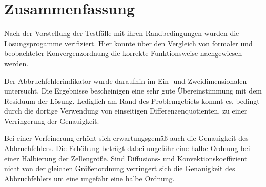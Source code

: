 \section{Zusammenfassung}
Nach der Vorstellung der Testfälle mit ihren Randbedingungen wurden
die Lösungsprogamme verifiziert. Hier konnte über den Vergleich von formaler
und beobachteter Konvergenzordnung die korrekte Funktionsweise nachgewiesen werden.

Der Abbruchfehlerindikator wurde daraufhin im Ein- und Zweidimensionalen untersucht.
Die Ergebnisse bescheinigen eine sehr gute Übereinstimmung mit dem Residuum
der Lösung. Lediglich am Rand des Problemgebiets kommt es, bedingt durch die dortige Verwendung von
einseitigen Differenzenquotienten, zu einer Verringerung der Genauigkeit.

Bei einer Verfeinerung erhöht sich erwartungsgemäß auch die Genauigkeit
des Abbruchfehlers. Die Erhöhung beträgt dabei ungefähr eine halbe Ordnung
bei einer Halbierung der Zellengröße. Sind Diffusions- und Konvektionskoeffizient
nicht von der gleichen Größenordnung verringert sich die Genauigkeit
des Abbruchfehlers um eine ungefähr eine halbe Ordnung.



\clearpage
